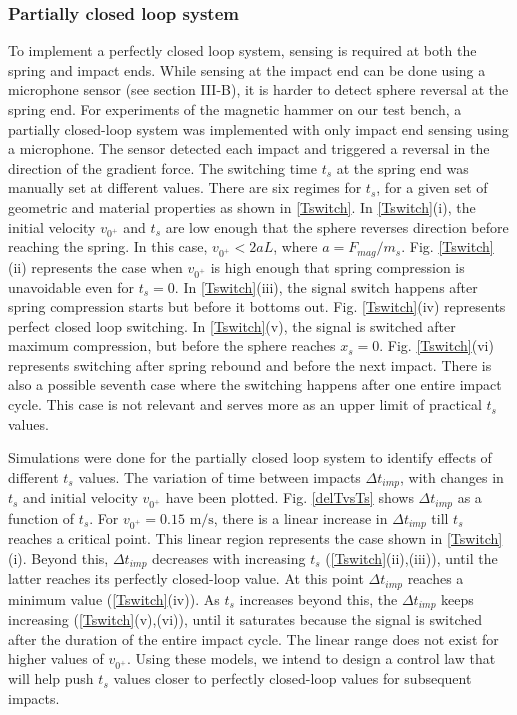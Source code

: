 \documentclass[letterpaper, 10 pt, conference]{ieeeconf}  %
\begin{document}
\subsubsection{Partially closed loop system}

To implement a perfectly closed loop system, sensing is required at both the spring and impact ends. While sensing at the impact end can be done using a microphone sensor (see section III-B), it is harder to detect sphere reversal at the spring end. For experiments of the magnetic hammer on our test bench, a partially closed-loop system was implemented with only impact end sensing using a microphone. The sensor detected each impact and triggered a reversal in the direction of the gradient force. The switching time $t_s$ at the spring end was manually set at different values. There are six regimes for $t_s$, for a given set of geometric and material properties as shown in \cref{Tswitch}. In \cref{Tswitch}(i), the initial velocity $v_{0^+}$ and $t_s$ are low enough that the sphere reverses direction before reaching the spring. In this case, $v_{0^+} < 2aL$, where $a=F_{mag}/m_s$. Fig. \ref{Tswitch}(ii) represents the case when $v_{0^+}$ is high enough that spring compression is unavoidable even for $t_s = 0$. In \cref{Tswitch}(iii), the signal switch happens after spring compression starts but before it bottoms out. Fig. \ref{Tswitch}(iv) represents perfect closed loop switching. In \cref{Tswitch}(v), the signal is switched after maximum compression, but before the sphere reaches $x_s=0$. Fig. \ref{Tswitch}(vi) represents switching after spring rebound and before the next impact. There is also a possible seventh case where the switching happens after one entire impact cycle. This case is not relevant and serves more as an upper limit of practical $t_s$ values. 

Simulations were done for the partially closed loop system to identify effects of different $t_s$ values. The variation of time between impacts $\Delta t_{imp}$, with changes in $t_s$ and initial velocity $v_{0^+}$ have been plotted. Fig. \ref{delTvsTs} shows $\Delta t_{imp}$ as a function of $t_s$. For $v_{0^+}=0.15\text{ m/s}$, there is a linear increase in $\Delta t_{imp}$ till $t_s$ reaches a critical point. This linear region represents the case shown in \cref{Tswitch}(i). Beyond this, $\Delta t_{imp}$ decreases with increasing $t_s$ (\cref{Tswitch}(ii),(iii)), until the latter reaches its perfectly closed-loop value. At this point $\Delta t_{imp}$ reaches a minimum value (\cref{Tswitch}(iv)). As $t_s$ increases beyond this, the $\Delta t_{imp}$ keeps increasing (\cref{Tswitch}(v),(vi)), until it saturates because the signal is switched after the duration of the entire impact cycle. The linear range does not exist for higher values of $v_{0^+}$. Using these models, we intend to design a control law that will help push $t_s$ values closer to perfectly closed-loop values for subsequent impacts.
\end{document}
